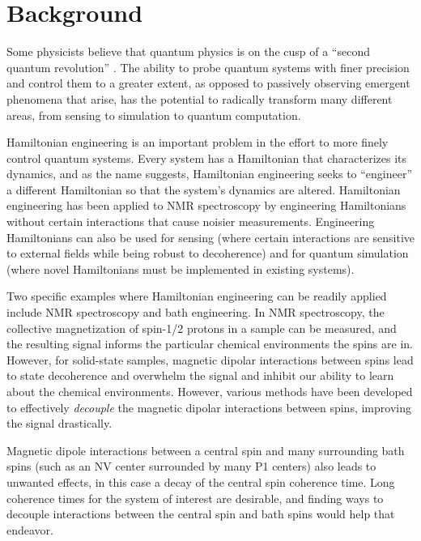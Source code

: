 \chapter{Background}


Some physicists believe that quantum physics is on the cusp of a ``second quantum revolution'' \cite{quantum-rev}. The ability to probe quantum systems with finer precision and control them to a greater extent, as opposed to passively observing emergent phenomena that arise, has the potential to radically transform many different areas, from sensing to simulation to quantum computation.

Hamiltonian engineering is an important problem in the effort to more finely control quantum systems.
Every system has a Hamiltonian that characterizes its dynamics, and as the name suggests, Hamiltonian engineering seeks to ``engineer'' a different Hamiltonian so that the system's dynamics are altered. Hamiltonian engineering has been applied to NMR spectroscopy by engineering Hamiltonians without certain interactions that cause noisier measurements. Engineering Hamiltonians can also be used for sensing (where certain interactions are sensitive to external fields while being robust to decoherence) and for quantum simulation (where novel Hamiltonians must be implemented in existing systems).

Two specific examples where Hamiltonian engineering can be readily applied include NMR spectroscopy and bath engineering. In NMR spectroscopy, the collective magnetization of spin-1/2 protons in a sample can be measured, and the resulting signal informs the particular chemical environments the spins are in. However, for solid-state samples, magnetic dipolar interactions between spins lead to state decoherence
and overwhelm the signal and inhibit our ability to learn about the chemical environments. However, various methods have been developed to effectively \emph{decouple} the magnetic dipolar interactions between spins, improving the signal drastically.

Magnetic dipole interactions between a central spin and many surrounding bath spins (such as an NV center surrounded by many P1 centers) also leads to unwanted effects, in this case a decay of the central spin coherence time. Long coherence times for the system of interest are desirable, and finding ways to decouple interactions between the central spin and bath spins would help that endeavor.

